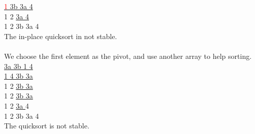 \documentclass[10.5pt]{article}
\newcommand{\redtext}[1]{\textcolor{red}{#1}}
\begin{document}
	\underline{\redtext{1} \boxed{\redtext{2}}  3b 3a 4}\\
	1 2 \underline{ 3a 4}\\
	1 2 3b 3a 4\\
	The in-place quicksort in not stable.\\
	\\
	We choose the first element as the pivot, and use another array to help sorting.\\
	\underline{ 3a 3b 1 4}\\
	\underline{1  4 3b 3a}\\
	1 2 \underline{ 3b 3a}\\
	1 2 \underline{3b 3a }\\
	1 2 \underline{ 3a } 4\\
	1 2 3b 3a 4\\
	The quicksort is not stable.
	\pagebreak
	
\end{document}
